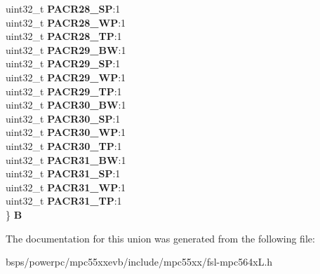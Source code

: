 \begin{DoxyCompactItemize}
\begin{tabbing}
\>uint32\_t {\bfseries PACR28\_SP}:1\\
\>uint32\_t {\bfseries PACR28\_WP}:1\\
\>uint32\_t {\bfseries PACR28\_TP}:1\\
\>uint32\_t {\bfseries PACR29\_BW}:1\\
\>uint32\_t {\bfseries PACR29\_SP}:1\\
\>uint32\_t {\bfseries PACR29\_WP}:1\\
\>uint32\_t {\bfseries PACR29\_TP}:1\\
\>uint32\_t {\bfseries PACR30\_BW}:1\\
\>uint32\_t {\bfseries PACR30\_SP}:1\\
\>uint32\_t {\bfseries PACR30\_WP}:1\\
\>uint32\_t {\bfseries PACR30\_TP}:1\\
\>uint32\_t {\bfseries PACR31\_BW}:1\\
\>uint32\_t {\bfseries PACR31\_SP}:1\\
\>uint32\_t {\bfseries PACR31\_WP}:1\\
\>uint32\_t {\bfseries PACR31\_TP}:1\\
\} {\bfseries B}\\

\end{tabbing}\end{DoxyCompactItemize}


The documentation for this union was generated from the following file\+:\begin{DoxyCompactItemize}
\item 
bsps/powerpc/mpc55xxevb/include/mpc55xx/fsl-\/mpc564x\+L.\+h\end{DoxyCompactItemize}
